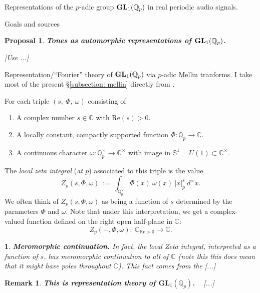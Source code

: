 \documentclass[letterpaper,11pt, reqno]{amsart}
\newtheorem{monodromy theorem}{Monodromy Theorem}[subsection]
\newtheorem{wild conjecture}[theorem]{Wild Conjecture}
\newtheorem{proposal}[theorem]{Proposal}
\newtheorem{research objectives}{Research objectives}[subsection]
\newtheorem{research question}[theorem]{Research questions}
\newtheorem{aside question}[theorem]{Aside question}
\newtheorem{audio example}[theorem]{\loudspeaker[3] Example}
\newtheorem{blank remark}[theorem]{}
\newtheorem{ssubsection}[theorem]{}
\newtheorem{terminology and comment}[theorem]{Terminology and comment}
\newtheorem{purity hypothesis}[theorem]{Purity hypothesis}
\newtheorem{corollary of the purity hypothesis}[theorem]{Corollary of the purity hypothesis}
\newtheorem{rem1}[theorem]{Remark}
\newenvironment{remark}{\begin{rem1}\em}{\end{rem1}}
\newcommand{\CC} {{\mathbb C}}
\newcommand{\QQ} {{\mathbb Q}}
\newcommand{\lra}{{\longrightarrow}}
\numberwithin{equation}{theorem}
\begin{document}
\begin{section}{Representations of the $p$-adic group $\bold{GL}_{1}(\mathbb{Q}_{p})$
in real periodic audio signals.}
\begin{subsection}{Goals and sources}
\end{subsection}

\begin{proposal}\label{proposal: automorphic reps}
{\bf Tones as automorphic representations of $\bold{GL}_{1}(\QQ_p)$.}
\normalfont

{\color{red} [Use \cite[\S\S2.3-5]{GHv1}...]}
\end{proposal}

\begin{subsection}{Representation/``Fourier'' theory of $\bold{GL}_{1}(\QQ_p)$ via $p$-adic Mellin tranforms.}\label{subsection: mellin}
	I take most of the present \S\ref{subsection: mellin} directly from \cite[\S\S2.3 \& 2.8]{GHv1}.
	
	For each triple $(s,\ \Phi,\ \omega)$ consisting of
	\begin{enumerate}[{\bf\ \ \ \ \ \ $\bullet$}]
	\item
	A complex number $s\in\CC$ with $\text{Re}(s)>0$.
	\item
	A locally constant, compactly supported function $\Phi:\QQ_{p}\lra\CC$.
	\item
	A continuous character $\omega:\QQ_{p}^\times\lra\CC^\times$ with image in $\mathbb{S}^{1}=U(1)\subset\CC^{\times}$.
	\end{enumerate}
The {\em local zeta integral} ({\em at $p$}) associated to this triple is the value
	$$
	Z_{p}(s,\Phi,\omega)
	\ :=\ 
	\int_{\QQ^{\times}_{p}}\Phi(x)\ \omega(x)\ |x|^{s}_{p}\ d^{\times\!}x.
	$$
We often think of $Z_{p}(s,\Phi,\omega)$ as being a function of $s$ determined by the parameters $\Phi$ and $\omega$. Note that under this interpretation, we get a complex-valued function defined on the right open half-plane in $\CC$:
	$$
	Z_p(-,\Phi,\omega)
	:
	\ 
	\CC_{\text{Re}>0}\lra\CC.
	$$

\begin{ssubsection}{{\bf Meromorphic continuation.}}
\normalfont
	In fact, the local Zeta integral, interpreted as a function of $s$, has meromorphic continuation to all of $\CC$ (note this this does mean that it might have poles throughout $\CC$). This fact comes from the {\color{red} [...]}
	
\end{ssubsection}

\begin{remark}{{\bf This is representation theory of $\pmb{GL}_{1}(\QQ_{p})$.}}
\ {\color{red} [...]}
\end{remark}


\end{subsection}
\end{section}
\end{document}
